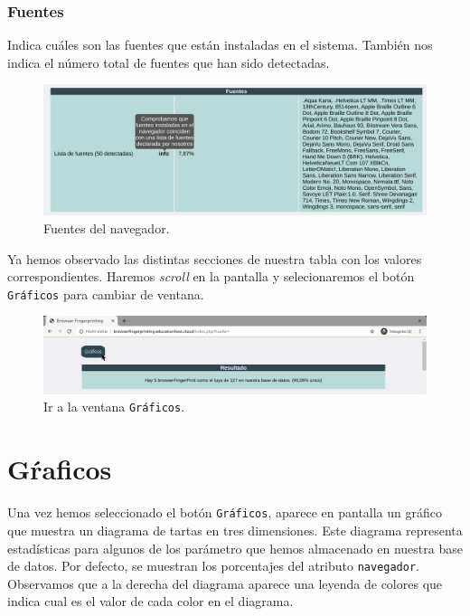 \subsubsection{Fuentes}
Indica cuáles son las fuentes que están instaladas en el sistema. También nos indica el número total de fuentes que han sido detectadas.

\begin{figure}[H]
	\centering
	\includegraphics[width=1\textwidth]{Images/fuentesSection.png}
	\caption{Fuentes del navegador.}
	\label{fig:fuentesSection}
\end{figure}

Ya hemos observado las distintas secciones de nuestra tabla con los valores correspondientes. Haremos \textit{scroll} en la pantalla y selecionaremos el botón \texttt{Gráficos} para cambiar de ventana.

\begin{figure}[H]
	\centering
	\includegraphics[width=1\textwidth]{Images/graficosBoton.png}
	\caption{Ir a la ventana \texttt{Gráficos}.}
	\label{fig:graficosBoton}
\end{figure}


\section{Gŕaficos}

Una vez hemos seleccionado el botón \texttt{Gráficos}, aparece en pantalla un gráfico que muestra un diagrama de tartas en tres dimensiones. 
Este diagrama representa estadísticas para algunos de los parámetro que hemos almacenado en nuestra base de datos. Por defecto, se muestran los porcentajes del atributo \texttt{navegador}. Observamos que a la derecha del diagrama aparece una leyenda de colores que indica cual es el valor de cada color en el diagrama. 

